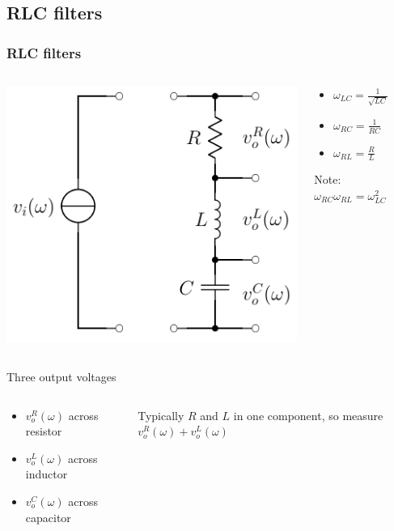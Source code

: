 \documentclass[beamer]{standalone}
\begin{document}
\subsection{RLC filters}
\begin{frame}
 \frametitle{RLC filters}
 \begin{columns}
  \begin{column}{0.4\textwidth}
   \includegraphics[width=\textwidth]{pics/RLC_circuit}
  \end{column}
  \begin{column}{0.6\textwidth}
   \begin{itemize}
    \item $\omega_{LC} = \frac{1}{\sqrt{LC}}$
    \item $\omega_{RC} = \frac{1}{RC}$
    \item $\omega_{RL} = \frac{R}{L}$
   \end{itemize}
   Note: $\omega_{RC} \omega_{RL} = \omega^2_{LC}$
  \end{column}
 \end{columns}
 \begin{block}{Three output voltages}
  \begin{columns}
   \begin{column}{0.5\textwidth}
    \begin{itemize}
     \item $v_o^R(\omega)$ across resistor
     \item $v_o^L(\omega)$ across inductor
     \item $v_o^C(\omega)$ across capacitor
    \end{itemize}
   \end{column}
   \begin{column}{0.5\textwidth}
    Typically $R$ and $L$ in one component, so measure $v_o^R(\omega) + v_o^L(\omega)$
   \end{column}
  \end{columns}
 \end{block}
\end{frame}
\end{document}
